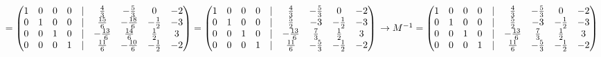 $=
\begin{pmatrix}
1 & 0 & 0 & 0 & | & \frac{4}{3} & -\frac{5}{3} & 0 & -2 \\
0 & 1 & 0 & 0 & | & \frac{15}{6} & -\frac{18}{6} & -\frac{1}{2} & -3 \\
0 & 0 & 1 & 0 & | & -\frac{13}{6} & \frac{14}{6} & \frac{1}{2} & 3 \\
0 & 0 & 0 & 1 & | & \frac{11}{6} & -\frac{10}{6} & -\frac{1}{2} & -2
\end{pmatrix}
=
\begin{pmatrix}
1 & 0 & 0 & 0 & | & \frac{4}{3} & -\frac{5}{3} & 0 & -2 \\
0 & 1 & 0 & 0 & | & \frac{5}{2} & -3 & -\frac{1}{2} & -3 \\
0 & 0 & 1 & 0 & | & -\frac{13}{6} & \frac{7}{3} & \frac{1}{2} & 3 \\
0 & 0 & 0 & 1 & | & \frac{11}{6} & -\frac{5}{3} & -\frac{1}{2} & -2
\end{pmatrix}\\
\rightarrow M^{-1} = 
\begin{pmatrix}
1 & 0 & 0 & 0 & | & \frac{4}{3} & -\frac{5}{3} & 0 & -2 \\
0 & 1 & 0 & 0 & | & \frac{5}{2} & -3 & -\frac{1}{2} & -3 \\
0 & 0 & 1 & 0 & | & -\frac{13}{6} & \frac{7}{3} & \frac{1}{2} & 3 \\
0 & 0 & 0 & 1 & | & \frac{11}{6} & -\frac{5}{3} & -\frac{1}{2} & -2
\end{pmatrix}
$